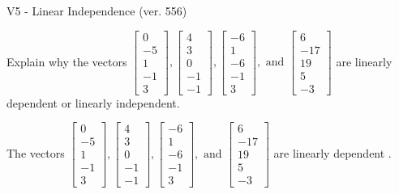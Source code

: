 \begin{exercise}
  \begin{exerciseTitle}V5 - Linear Independence (ver. 556)\end{exerciseTitle}
  \begin{exerciseStatement}
    Explain why the vectors \(\left[\begin{array}{r}
0 \\
-5 \\
1 \\
-1 \\
3
\end{array}\right] , \left[\begin{array}{r}
4 \\
3 \\
0 \\
-1 \\
-1
\end{array}\right] , \left[\begin{array}{r}
-6 \\
1 \\
-6 \\
-1 \\
3
\end{array}\right] , \text{ and } \left[\begin{array}{r}
6 \\
-17 \\
19 \\
5 \\
-3
\end{array}\right]\) are linearly dependent or linearly independent.	


  \end{exerciseStatement}
  \begin{exerciseAnswer}
   The vectors \(\left[\begin{array}{r}
0 \\
-5 \\
1 \\
-1 \\
3
\end{array}\right] , \left[\begin{array}{r}
4 \\
3 \\
0 \\
-1 \\
-1
\end{array}\right] , \left[\begin{array}{r}
-6 \\
1 \\
-6 \\
-1 \\
3
\end{array}\right] , \text{ and } \left[\begin{array}{r}
6 \\
-17 \\
19 \\
5 \\
-3
\end{array}\right]\) are 
  	 linearly dependent  .
  


  \end{exerciseAnswer}
\end{exercise}